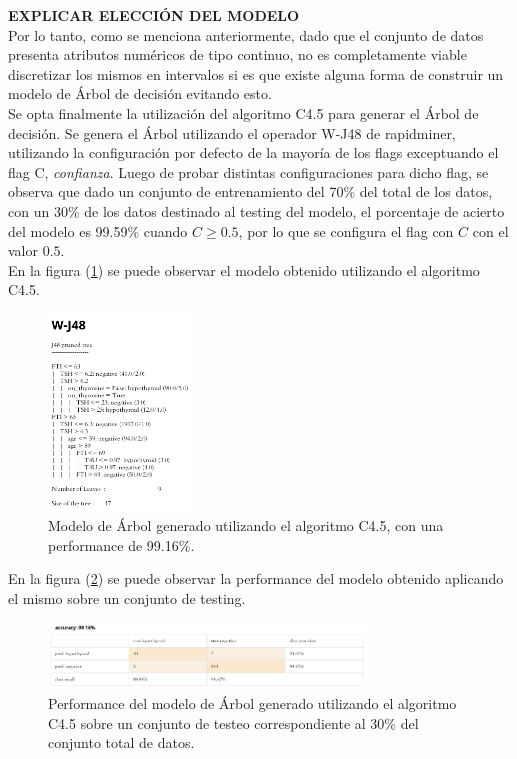 \documentclass[osajnl,twocolumn,showpacs,superscriptaddress,10pt,floatfix]{revtex4-1} %
\begin{document}
\textbf{EXPLICAR ELECCIÓN DEL MODELO} \\

Por lo tanto, como se menciona anteriormente, dado que el conjunto de datos presenta atributos numéricos de tipo continuo, no es completamente viable discretizar los mismos en intervalos si es que existe alguna forma de construir un modelo de Árbol de decisión evitando esto. \\

Se opta finalmente la utilización del algoritmo C4.5 para generar el Árbol de decisión. Se genera el Árbol utilizando el operador W-J48 de rapidminer, utilizando la configuración por defecto de la mayoría de los flags exceptuando el flag C, \textit{confianza}. Luego de probar distintas configuraciones para dicho flag, se observa que dado un conjunto de entrenamiento del 70\% del total de los datos, con un 30\% de los datos destinado al testing del modelo, el porcentaje de acierto del modelo es 99.59\% cuando $C \geq 0.5$, por lo que se configura el flag con $C$ con el valor $0.5$. \\

En la figura (\ref{figure:w_j48}) se puede observar el modelo obtenido utilizando el algoritmo C4.5.

\begin{figure}[H]
    \centering
    \includegraphics[width=0.35\textwidth]{models/w_j48}
    \caption{Modelo de Árbol generado utilizando el algoritmo C4.5, con una performance de 99.16\%.}
    \label{figure:w_j48}
\end{figure}

En la figura (\ref{figure:w_j48_performance}) se puede observar la performance del modelo obtenido aplicando el mismo sobre un conjunto de testing. \\

\onecolumngrid

\begin{figure}[ht]
    \centering
    \includegraphics[width=0.75\textwidth]{models/w_j48_performance}
    \caption{Performance del modelo de Árbol generado utilizando el algoritmo C4.5 sobre un conjunto de testeo correspondiente al 30\% del conjunto total de datos.}
    \label{figure:w_j48_performance}
\end{figure}
\end{document}
